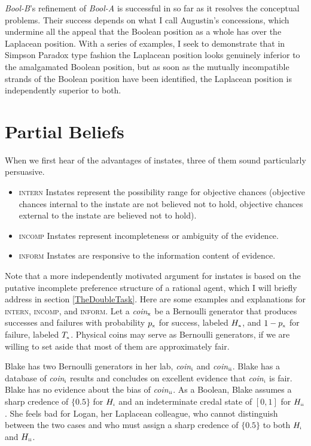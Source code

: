 \documentclass[11pt]{article}
\newcommand{\anderson}[0]{\textit{Bool-A}}
\newcommand{\augustin}[0]{\textit{Bool-B}}
\begin{document}
{\augustin}'s refinement of {\anderson} is successful in so far as it
resolves the conceptual problems. Their success depends on what I call
Augustin's concessions, which undermine all the appeal that the
Boolean position as a whole has over the Laplacean position. With a
series of examples, I seek to demonstrate that in Simpson Paradox type
fashion the Laplacean position looks genuinely inferior to the
amalgamated Boolean position, but as soon as the mutually incompatible
strands of the Boolean position have been identified, the Laplacean
position is independently superior to both.

\section{Partial Beliefs}
\label{amalgamated}

When we first hear of the advantages of instates, three of
them sound particularly persuasive.

\begin{itemize}
\item \textsc{intern} Instates represent the possibility range for
  objective chances (objective chances internal to the instate are not
  believed not to hold, objective chances external to the instate are
  believed not to hold).
\item \textsc{incomp} Instates represent incompleteness or
  ambiguity of the evidence.
\item \textsc{inform} Instates are responsive to the information
  content of evidence.
\end{itemize}

Note that a more independently motivated argument for instates is
based on the putative incomplete preference structure of a rational
agent, which I will briefly address in section \ref{TheDoubleTask}.
Here are some examples and explanations for \textsc{intern},
\textsc{incomp}, and \textsc{inform}. Let a
\textit{coin}$_{\mbox{\tiny{x}}}$ be a Bernoulli generator that
produces successes and failures with probability $p_{\mbox{\tiny{x}}}$
for success, labeled $H_{\mbox{\tiny{x}}}$, and
$1-p_{\mbox{\tiny{x}}}$ for failure, labeled $T_{\mbox{\tiny{x}}}$.
Physical coins may serve as Bernoulli generators, if we are willing to
set aside that most of them are approximately fair.

\begin{quotex}
  \label{ex:range} Blake has two Bernoulli generators in
  her lab, \textit{coin}$_{\mbox{\tiny{i}}}$ and
  \textit{coin}$_{\mbox{\tiny{ii}}}$. Blake has a database of
  \textit{coin}$_{\mbox{\tiny{i}}}$ results and concludes on excellent
  evidence that \textit{coin}$_{\mbox{\tiny{i}}}$ is fair. Blake has no
  evidence about the bias of \textit{coin}$_{\mbox{\tiny{ii}}}$. As a
  Boolean, Blake assumes a sharp credence of $\{0.5\}$ for
  $H_{\mbox{\tiny{i}}}$ and an indeterminate credal state of $[0,1]$
  for $H_{\mbox{\tiny{ii}}}$. She feels bad for Logan, her Laplacean
  colleague, who cannot distinguish between the two cases and who must
  assign a sharp credence of $\{0.5\}$ to both $H_{\mbox{\tiny{i}}}$
  and $H_{\mbox{\tiny{ii}}}$.
\end{quotex}
\end{document}

